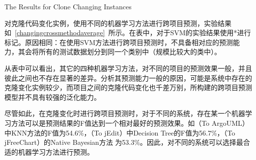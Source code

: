 
{The Results for Clone Changing Instances}

对克隆代码变化实例，使用不同的机器学习方法进行跨项目预测，实验结果如~\ref{changingcrossmethodaverage}~所示。在表中，对于SVM的实验结果使用{*}进行标记。原因相同：在使用SVM方法进行跨项目预测时，不具备相对应的预测能力，其会将所有的测试数据划分到同一个类别中（规模比较大的类中）。

从表中可以看出，其它的四种机器学习方法，对不同的项目的预测效果一般，并且彼此之间也不存在显著的差异。分析其预测能力一般的原因，可能是系统中存在的克隆变化实例较少，而项目之间的克隆代码变化也千差万别，所构建的跨项目预测模型并不具有较强的泛化能力。

尽管如此，在克隆变化时进行跨项目预测时，对于不同的系统，存在某一个机器学习方法可以是预测结果的F值达到一个相对最好的预测效果。如（To ArgoUML）中KNN方法的F值为54.6\%，（To jEdit）中Decision Tree的F值为56.7\%，（To jFreeChart）的Native Bayesian方法 为53.3\%。因此，对不同的系统可以选择最合适的机器学习方法进行预测。 


